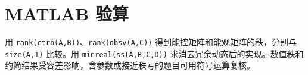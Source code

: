 \section{MATLAB 验算}

用 \texttt{rank(ctrb(A,B))}、\texttt{rank(obsv(A,C))} 得到能控矩阵和能观矩阵的秩，分别与 \texttt{size(A,1)} 比较。用 \texttt{minreal(ss(A,B,C,D))} 求消去冗余动态后的实现。数值秩和约简结果受容差影响，含参数或接近秩亏的题目可用符号运算复核。



